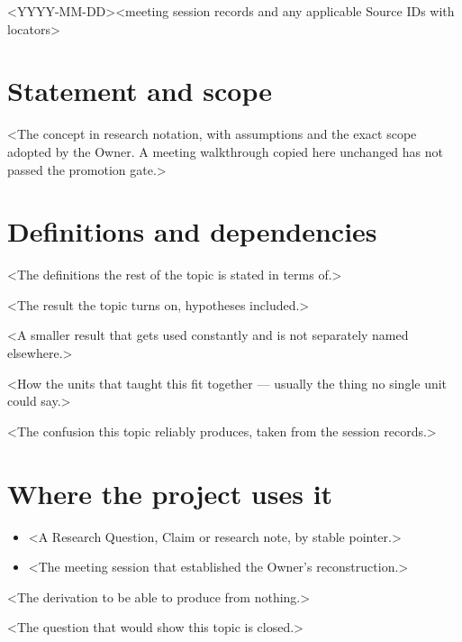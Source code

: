 \documentclass[a4paper,10pt]{article}
\begin{document}
%
  {<YYYY-MM-DD>}{<meeting session records and any applicable Source IDs with locators>}

\section{Statement and scope}
<The concept in research notation, with assumptions and the exact scope adopted by the Owner. A
meeting walkthrough copied here unchanged has not passed the promotion gate.>

\section{Definitions and dependencies}

\begin{defn}[<term>]
<The definitions the rest of the topic is stated in terms of.>
\end{defn}

\begin{thm}[<name>]
<The result the topic turns on, hypotheses included.>
\end{thm}

\begin{prop}
<A smaller result that gets used constantly and is not separately named elsewhere.>
\end{prop}

\begin{remark}
<How the units that taught this fit together --- usually the thing no single unit could say.>
\end{remark}

\begin{warning}
<The confusion this topic reliably produces, taken from the session records.>
\end{warning}

\section{Where the project uses it}
\begin{itemize}
  \item <A Research Question, Claim or research note, by stable pointer.>
  \item <The meeting session that established the Owner's reconstruction.>
\end{itemize}

\begin{checkyourself}
  \item <The derivation to be able to produce from nothing.>
  \item <The question that would show this topic is closed.>
\end{checkyourself}
\end{document}
